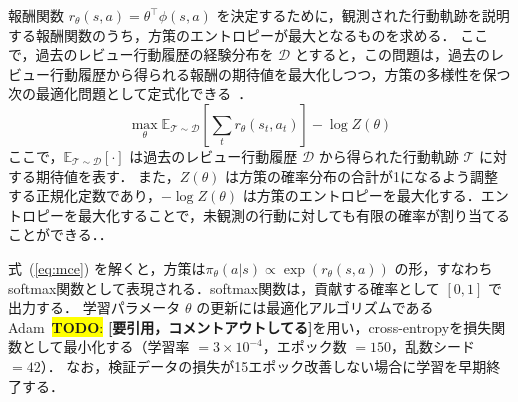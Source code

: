 \documentclass[submit,noauthor,ses,dvipdfmx]{ipsj}
\newcommand{\todo}[1]{\colorbox{yellow}{{\bf TODO}:}{\color{red} {\textbf{[#1]}}}}
\begin{document}
報酬関数 $r_\theta(s,a) = \theta^\top \phi(s,a)$ を決定するために，観測された行動軌跡を説明する報酬関数のうち，方策のエントロピーが最大となるものを求める．
ここで，過去のレビュー行動履歴の経験分布を $\mathcal{D}$ とすると，この問題は，過去のレビュー行動履歴から得られる報酬の期待値を最大化しつつ，方策の多様性を保つ次の最適化問題として定式化できる~\cite{ziebart}．
\begin{equation}
\max_\theta \mathbb{E}_{\mathcal{T} \sim \mathcal{D}}
\left[\sum_t r_\theta(s_t, a_t)\right] - \log Z(\theta)
\label{eq:mce}
\end{equation}
ここで，$\mathbb{E}_{\mathcal{T} \sim \mathcal{D}}[\cdot]$ は過去のレビュー行動履歴 $\mathcal{D}$ から得られた行動軌跡 $\mathcal{T}$ に対する期待値を表す．
また，$Z(\theta)$ は方策の確率分布の合計が1になるよう調整する正規化定数であり，$-\log Z(\theta)$ は方策のエントロピーを最大化する．エントロピーを最大化することで，未観測の行動に対しても有限の確率が割り当てることができる．．

式~(\ref{eq:mce}) を解くと，方策は$\pi_\theta(a|s) \propto \exp(r_\theta(s,a))$ の形，すなわちsoftmax関数として表現される．softmax関数は，貢献する確率として $[0, 1]$ で出力する．
学習パラメータ $\theta$ の更新には最適化アルゴリズムであるAdam~\todo{要引用，コメントアウトしてる}を用い，cross-entropyを損失関数として最小化する（学習率 $= 3\times10^{-4}$，エポック数 $= 150$，乱数シード $= 42$）．
なお，検証データの損失が15エポック改善しない場合に学習を早期終了する．







\end{document}
